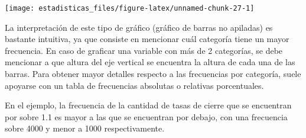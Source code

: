 \documentclass[
  11pt,
]{book}
\newenvironment{Shaded}{\begin{snugshade}}{\end{snugshade}}
\newcommand{\AttributeTok}[1]{\textcolor[rgb]{0.13,0.29,0.53}{#1}}
\newcommand{\CommentTok}[1]{\textcolor[rgb]{0.56,0.35,0.01}{\textit{#1}}}
\newcommand{\FloatTok}[1]{\textcolor[rgb]{0.00,0.00,0.81}{#1}}
\newcommand{\FunctionTok}[1]{\textcolor[rgb]{0.13,0.29,0.53}{\textbf{#1}}}
\newcommand{\NormalTok}[1]{#1}
\newcommand{\OtherTok}[1]{\textcolor[rgb]{0.56,0.35,0.01}{#1}}
\newcommand{\SpecialCharTok}[1]{\textcolor[rgb]{0.81,0.36,0.00}{\textbf{#1}}}
\newcommand{\StringTok}[1]{\textcolor[rgb]{0.31,0.60,0.02}{#1}}
\theoremstyle{definition}
\theoremstyle{definition}
\theoremstyle{definition}
\theoremstyle{definition}
\theoremstyle{remark}
\begin{document}
\begin{Shaded}
\end{Shaded}

\begin{center}\texttt{[image: estadisticas\_files/figure-latex/unnamed-chunk-27-1]} \end{center}

La interpretación de este tipo de gráfico (gráfico de barras no apiladas) es bastante intuitiva, ya que consiste en mencionar cuál categoría tiene un mayor frecuencia. En caso de graficar una variable con más de 2 categorías, se debe mencionar a que altura del eje vertical se encuentra la altura de cada una de las barras. Para obtener mayor detalles respecto a las frecuencias por categoría, suele apoyarse con un tabla de frecuencias absolutas o relativas porcentuales.

En el ejemplo, la frecuencia de la cantidad de tasas de cierre que se encuentran por sobre 1.1 es mayor a las que se encuentran por debajo, con una frecuencia sobre 4000 y menor a 1000 respectivamente.
\end{document}
